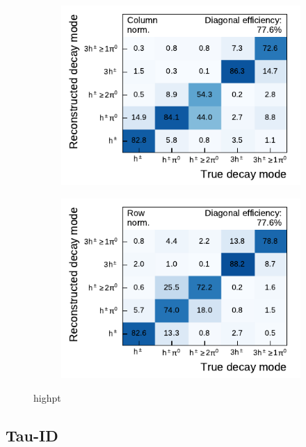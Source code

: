 \begin{figure}[htb]
  \begin{subfigure}{0.48\textwidth}
    \centering
    \includegraphics{./figures/decay_mode_classification/highpt/mig_mat_pt_geq_100.pdf}
  \end{subfigure}\hfill
  \begin{subfigure}{0.48\textwidth}
    \centering
    \includegraphics{./figures/decay_mode_classification/highpt/comp_mat_geq_100.pdf}
  \end{subfigure}
  \caption{highpt}
  \label{fig:highpt_matrices}
\end{figure}

\subsection{Tau-ID}

